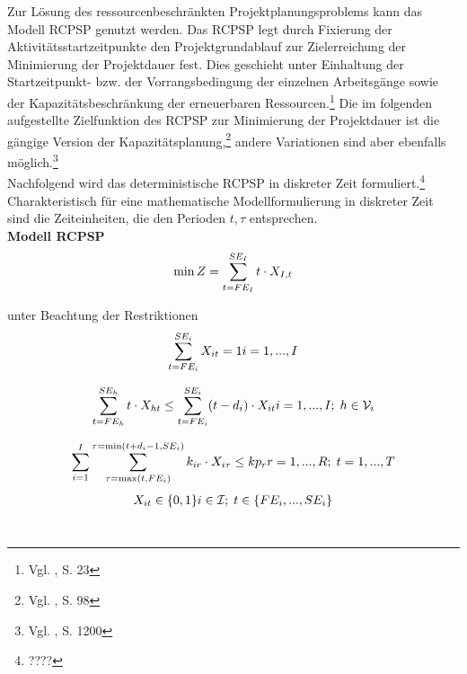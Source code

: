 \documentclass[a4paper,12pt,parskip,bibtotoc,liststotoc]{article}
\begin{document}
Zur Lösung des ressourcenbeschränkten Projektplanungsproblems kann das Modell RCPSP genutzt werden. Das RCPSP legt durch Fixierung der Aktivitätsstartzeitpunkte den Projektgrundablauf zur Zielerreichung der Minimierung der Projektdauer fest. Dies geschieht unter Einhaltung der Startzeitpunkt- bzw. der Vorrangsbedingung der einzelnen Arbeitsgänge sowie der Kapazitätsbeschränkung der erneuerbaren Ressourcen.\footnote{Vgl. \cite{demeulemeester2011robust}, S. 23} Die im folgenden aufgestellte Zielfunktion des RCPSP zur Minimierung der Projektdauer ist die gängige Version der Kapazitätsplanung,\footnote{Vgl. \cite{drexl1997neuere}, S. 98} andere Variationen sind aber ebenfalls möglich.\footnote{Vgl. \cite{talbot1982resource}, S. 1200}\\

Nachfolgend wird das deterministische RCPSP in diskreter Zeit formuliert.\footnote{????} Charakteristisch für eine mathematische Modellformulierung in diskreter Zeit sind die Zeiteinheiten, die den Perioden $t, \tau$ entsprechen.\\

\textbf{Modell RCPSP}
\begin{eqnarray} \label{Ziel}
\min Z = \sum_{t=FE_{I}}^{SE_{I}}t \cdot X_{I,t}\hfill  
\end{eqnarray}

unter Beachtung der Restriktionen
\begin{multline} \label{N1}
\sum_{t=FE_{i}}^{SE_{i}} X_{it} = 1
\hfill   i = 1,...,I
\end{multline}\vspace{-3.0ex}

\begin{multline} \label{N2}
\sum_{t=FE_{h}}^{SE_{h}}t \cdot X_{ht} \leq \sum_{t=FE_{i}}^{SE_{i}}(t - d_{i}) \cdot X_{it}
\hfill   i =1,...,I;\; h \in \mathcal{V}_{i}
\end{multline}\vspace{-3.0ex}

\begin{multline} \label{N3}
\sum_{i=1}^{I}\sum_{\tau=\max(t,FE_{i})}^{\tau=\min(t+d_i-1,SE_i)}k_ {ir} \cdot X_{i\tau} \leq kp_{r}
\hfill   r =1,...,R;\; t=1,...,T
\end{multline}\vspace{-3.0ex}
\begin{multline} \label{N4}
X_{it} \in \{0,1\}
\hfill   i \in \mathcal{I};\; t \in \{FE_{i},...,SE_{i}\}\end{multline}\vspace{-6.0ex}\\
\end{document}
